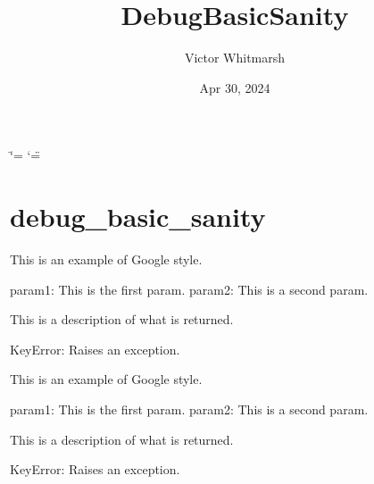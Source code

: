 \documentclass[letterpaper,10pt,english]{sphinxmanual}
\title{DebugBasicSanity}
\date{Apr 30, 2024}
\author{Victor Whitmarsh}
\begin{document}
\ifdefined\shorthandoff
  \ifnum\catcode`\=\string=\active\shorthandoff{=}\fi
  \ifnum\catcode`\"=\active{}\fi
\fi

\pagestyle{empty}
\sphinxmaketitle
\pagestyle{plain}
\sphinxtableofcontents
\pagestyle{normal}
\label{\detokenize{index::doc}}



\chapter{debug\_basic\_sanity}
\label{\detokenize{index:module-src.debug_basic_sanity.setup_class}}\label{\detokenize{index:debug-basic-sanity}}
\sphinxAtStartPar
This is an example of Google style.
\begin{description}
\sphinxAtStartPar
param1: This is the first param.
param2: This is a second param.

\sphinxAtStartPar
This is a description of what is returned.

\sphinxAtStartPar
KeyError: Raises an exception.

\end{description}

\begin{fulllineitems}
\label{\detokenize{index:src.debug_basic_sanity.setup_class.test_print_in_src}}
\pysigstartsignatures
{}
\pysigstopsignatures
\sphinxAtStartPar
This is an example of Google style.
\begin{description}
\sphinxAtStartPar
param1: This is the first param.
param2: This is a second param.

\sphinxAtStartPar
This is a description of what is returned.

\sphinxAtStartPar
KeyError: Raises an exception.

\end{description}

\end{fulllineitems}
\end{document}

